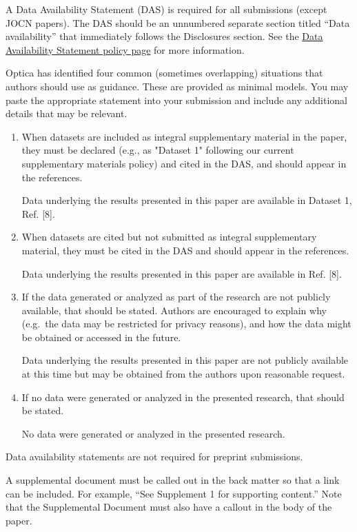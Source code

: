 \documentclass{optica-article}
\begin{document}
\begin{backmatter}
A Data Availability Statement (DAS) is required for all submissions (except JOCN papers). The DAS should be an unnumbered separate section titled ``Data availability'' that
immediately follows the Disclosures section. See the \href{https://opg.optica.org/submit/review/data-availability-policy.cfm}{Data Availability Statement policy page} for more information.

Optica has identified four common (sometimes overlapping) situations that authors should use as guidance. These are provided as minimal models. You may paste the appropriate statement into your submission and include any additional details that may be relevant.

\begin{enumerate}
\item When datasets are included as integral supplementary material in the paper, they must be declared (e.g., as "Dataset 1" following our current supplementary materials policy) and cited in the DAS, and should appear in the references.

 Data underlying the results presented in this paper are available in Dataset 1, Ref. [8].

\bigskip

\item When datasets are cited but not submitted as integral supplementary material, they must be cited in the DAS and should appear in the references.

 Data underlying the results presented in this paper are available in Ref. [8].

\bigskip

\item If the data generated or analyzed as part of the research are not publicly available, that should be stated. Authors are encouraged to explain why (e.g.~the data may be restricted for privacy reasons), and how the data might be obtained or accessed in the future.

 Data underlying the results presented in this paper are not publicly available at this time but may be obtained from the authors upon reasonable request.

\bigskip

\item If no data were generated or analyzed in the presented research, that should be stated.

 No data were generated or analyzed in the presented research.
\end{enumerate}

\bigskip

\noindent Data availability statements are not required for preprint submissions.

A supplemental document must be called out in the back matter so that a link can be included. For example, “See Supplement 1 for supporting content.” Note that the Supplemental Document must also have a callout in the body of the paper.

\end{backmatter}
\end{document}
